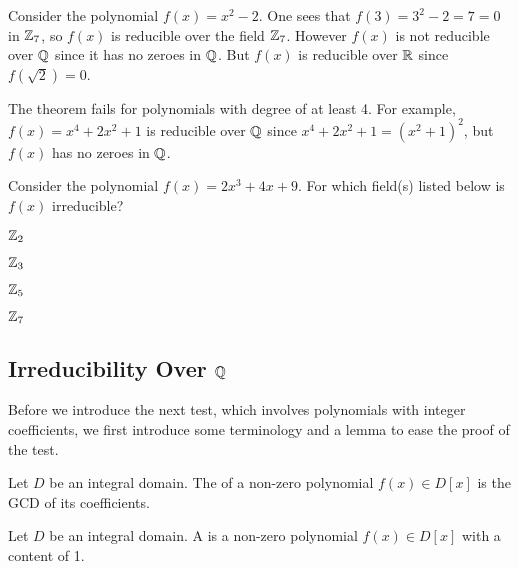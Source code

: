 \begin{example}
    Consider the polynomial $f(x) = x^2 - 2$. One sees that $f(3) = 3^2 - 2 = 7 = 0$ in $\mathbb{Z}_7$, so $f(x)$ is reducible over the field $\mathbb{Z}_7$. However $f(x)$ is not reducible over $\mathbb{Q}$ since it has no zeroes in $\mathbb{Q}$. But $f(x)$ is reducible over $\mathbb{R}$ since $f(\sqrt2) = 0$.
\end{example}

\begin{example}
    The theorem fails for polynomials with degree of at least 4. For example, $f(x) = x^4 + 2x^2 + 1$ is reducible over $\mathbb{Q}$ since $x^4 + 2x^2 + 1 = (x^2+1)^2$, but $f(x)$ has no zeroes in $\mathbb{Q}$.
\end{example}

\begin{exercise}
    Consider the polynomial $f(x) = 2x^3 + 4x + 9$. For which field(s) listed below is $f(x)$ irreducible?
    \begin{multicols}{4}
        \begin{partquestions}{\alph*}
            \item $\mathbb{Z}_2$
            \item $\mathbb{Z}_3$
            \item $\mathbb{Z}_5$
            \item $\mathbb{Z}_7$
        \end{partquestions}
    \end{multicols}
\end{exercise}

\subsection{Irreducibility Over $\mathbb{Q}$}
Before we introduce the next test, which involves polynomials with integer coefficients, we first introduce some terminology and a lemma to ease the proof of the test.

\begin{definition}
    Let $D$ be an integral domain. The  of a non-zero polynomial $f(x) \in D[x]$ is the GCD of its coefficients.
\end{definition}

\begin{definition}
    Let $D$ be an integral domain. A  is a non-zero polynomial $f(x) \in D[x]$ with a content of 1.
\end{definition}

